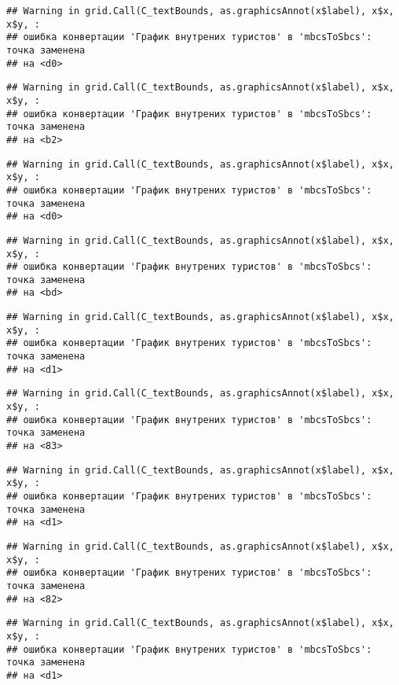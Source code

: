 \documentclass[
]{article}
\begin{document}
\begin{verbatim}
## Warning in grid.Call(C_textBounds, as.graphicsAnnot(x$label), x$x, x$y, :
## ошибка конвертации 'График внутрених туристов' в 'mbcsToSbcs': точка заменена
## на <d0>
\end{verbatim}

\begin{verbatim}
## Warning in grid.Call(C_textBounds, as.graphicsAnnot(x$label), x$x, x$y, :
## ошибка конвертации 'График внутрених туристов' в 'mbcsToSbcs': точка заменена
## на <b2>
\end{verbatim}

\begin{verbatim}
## Warning in grid.Call(C_textBounds, as.graphicsAnnot(x$label), x$x, x$y, :
## ошибка конвертации 'График внутрених туристов' в 'mbcsToSbcs': точка заменена
## на <d0>
\end{verbatim}

\begin{verbatim}
## Warning in grid.Call(C_textBounds, as.graphicsAnnot(x$label), x$x, x$y, :
## ошибка конвертации 'График внутрених туристов' в 'mbcsToSbcs': точка заменена
## на <bd>
\end{verbatim}

\begin{verbatim}
## Warning in grid.Call(C_textBounds, as.graphicsAnnot(x$label), x$x, x$y, :
## ошибка конвертации 'График внутрених туристов' в 'mbcsToSbcs': точка заменена
## на <d1>
\end{verbatim}

\begin{verbatim}
## Warning in grid.Call(C_textBounds, as.graphicsAnnot(x$label), x$x, x$y, :
## ошибка конвертации 'График внутрених туристов' в 'mbcsToSbcs': точка заменена
## на <83>
\end{verbatim}

\begin{verbatim}
## Warning in grid.Call(C_textBounds, as.graphicsAnnot(x$label), x$x, x$y, :
## ошибка конвертации 'График внутрених туристов' в 'mbcsToSbcs': точка заменена
## на <d1>
\end{verbatim}

\begin{verbatim}
## Warning in grid.Call(C_textBounds, as.graphicsAnnot(x$label), x$x, x$y, :
## ошибка конвертации 'График внутрених туристов' в 'mbcsToSbcs': точка заменена
## на <82>
\end{verbatim}

\begin{verbatim}
## Warning in grid.Call(C_textBounds, as.graphicsAnnot(x$label), x$x, x$y, :
## ошибка конвертации 'График внутрених туристов' в 'mbcsToSbcs': точка заменена
## на <d1>
\end{verbatim}
\end{document}
